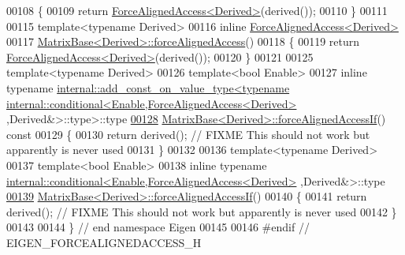 \begin{DoxyCode}
00108 \textcolor{keyword}{}\{
00109   \textcolor{keywordflow}{return} \hyperlink{group___core___module_class_eigen_1_1_force_aligned_access}{ForceAlignedAccess<Derived>}(derived());
00110 \}
00111 
00115 \textcolor{keyword}{template}<\textcolor{keyword}{typename} Derived>
00116 \textcolor{keyword}{inline} \hyperlink{group___core___module_class_eigen_1_1_force_aligned_access}{ForceAlignedAccess<Derived>}
00117 \hyperlink{group___core___module_ad2fdb842d9a715f8778d0b33c29cfe49}{MatrixBase<Derived>::forceAlignedAccess}()
00118 \{
00119   \textcolor{keywordflow}{return} \hyperlink{group___core___module_class_eigen_1_1_force_aligned_access}{ForceAlignedAccess<Derived>}(derived());
00120 \}
00121 
00125 \textcolor{keyword}{template}<\textcolor{keyword}{typename} Derived>
00126 \textcolor{keyword}{template}<\textcolor{keywordtype}{bool} Enable>
00127 \textcolor{keyword}{inline} \textcolor{keyword}{typename} 
      \hyperlink{struct_eigen_1_1internal_1_1add__const__on__value__type}{internal::add\_const\_on\_value\_type<typename internal::conditional<Enable,ForceAlignedAccess<Derived>}
      ,Derived&>::type>::type
\hyperlink{group___core___module_a90fa24e6942460822d2ca0724141487d}{00128} \hyperlink{group___core___module_class_eigen_1_1_matrix_base}{MatrixBase<Derived>::forceAlignedAccessIf}()\textcolor{keyword}{ const}
00129 \textcolor{keyword}{}\{
00130   \textcolor{keywordflow}{return} derived();  \textcolor{comment}{// FIXME This should not work but apparently is never used}
00131 \}
00132 
00136 \textcolor{keyword}{template}<\textcolor{keyword}{typename} Derived>
00137 \textcolor{keyword}{template}<\textcolor{keywordtype}{bool} Enable>
00138 \textcolor{keyword}{inline} \textcolor{keyword}{typename} \hyperlink{struct_eigen_1_1internal_1_1conditional}{internal::conditional<Enable,ForceAlignedAccess<Derived>}
      ,Derived&>::type
\hyperlink{group___core___module_a748ec59de03a5c51cc6acd3fe1f2ca06}{00139} \hyperlink{group___core___module_class_eigen_1_1_matrix_base}{MatrixBase<Derived>::forceAlignedAccessIf}()
00140 \{
00141   \textcolor{keywordflow}{return} derived();  \textcolor{comment}{// FIXME This should not work but apparently is never used}
00142 \}
00143 
00144 \} \textcolor{comment}{// end namespace Eigen}
00145 
00146 \textcolor{preprocessor}{#endif // EIGEN\_FORCEALIGNEDACCESS\_H}
\end{DoxyCode}
